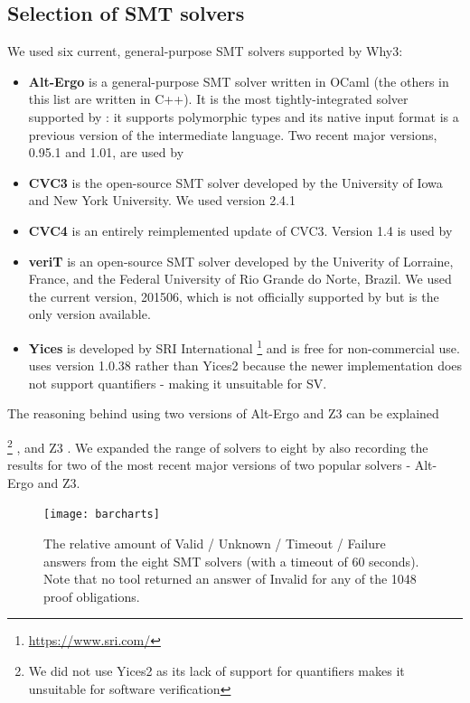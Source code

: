 \subsection{Selection of \textsc{SMT} solvers}
\label{sub:smtselection}

We used six current, general-purpose SMT solvers supported by \textsf{Why3}: 
\begin{itemize}
	\item \textbf{Alt-Ergo} \cite{AltErgo} is a general-purpose SMT solver written in OCaml (the others in this list are written in C++). It is the most tightly-integrated solver supported by \why: it supports polymorphic types and its native input format is a previous version of the \why intermediate language. Two recent major versions, 0.95.1 and 1.01, are used by \where
	\item \textbf{CVC3} \cite{CVC3} is the open-source SMT solver developed by the University of Iowa and New York University. We used version 2.4.1
	\item \textbf{CVC4} \cite{CVC4} is an entirely reimplemented update of CVC3. Version 1.4 is used by \where
	\item \textbf{veriT} \cite{veriT} is an open-source SMT solver developed by the Univerity of Lorraine, France, and the Federal University of Rio Grande do Norte, Brazil. We used the current version, 201506, which is not officially supported by \why but is the only version available.
	\item \textbf{Yices} \cite{Yices} is developed by SRI International \footnote{\url{https://www.sri.com/}} and is free for non-commercial use. \where uses version 1.0.38 rather than Yices2 because the newer implementation does not support quantifiers - making it unsuitable for SV.  
\end{itemize}

The reasoning behind using two versions of Alt-Ergo and Z3 can be explained

\footnote{We did not use Yices2 as its lack of support for quantifiers makes it unsuitable for software verification} , and Z3 \cite{Z3}. We expanded the range of solvers to eight by also recording the results for two of the most recent major versions of two popular solvers - Alt-Ergo and Z3.


\begin{figure}
	\centering
	\texttt{[image: barcharts]}
	\caption{The relative amount of Valid / Unknown / Timeout / Failure answers from the eight SMT solvers (with a timeout of 60 seconds). Note that no tool returned an answer of Invalid for any of the 1048 proof obligations.}
	\label{fig:barcharts}
\end{figure}

